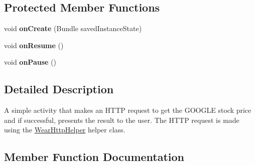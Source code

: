 \subsection*{Protected Member Functions}
\begin{DoxyCompactItemize}
\item 
void {\bfseries on\+Create} (Bundle saved\+Instance\+State)\hypertarget{classcom_1_1example_1_1android_1_1wearable_1_1wcldemo_1_1pages_1_1StockActivity_ad80d4d087998bba535840e7d6905025f}{}\label{classcom_1_1example_1_1android_1_1wearable_1_1wcldemo_1_1pages_1_1StockActivity_ad80d4d087998bba535840e7d6905025f}

\item 
void {\bfseries on\+Resume} ()\hypertarget{classcom_1_1example_1_1android_1_1wearable_1_1wcldemo_1_1pages_1_1StockActivity_a971a19cd31a4dc395d3a95d71b1d5694}{}\label{classcom_1_1example_1_1android_1_1wearable_1_1wcldemo_1_1pages_1_1StockActivity_a971a19cd31a4dc395d3a95d71b1d5694}

\item 
void {\bfseries on\+Pause} ()\hypertarget{classcom_1_1example_1_1android_1_1wearable_1_1wcldemo_1_1pages_1_1StockActivity_a95b544e3a283a8ac3cff062b303557c6}{}\label{classcom_1_1example_1_1android_1_1wearable_1_1wcldemo_1_1pages_1_1StockActivity_a95b544e3a283a8ac3cff062b303557c6}

\end{DoxyCompactItemize}


\subsection{Detailed Description}
A simple activity that makes an H\+T\+TP request to get the G\+O\+O\+G\+LE stock price and if successful, presents the result to the user. The H\+T\+TP request is made using the \hyperlink{}{Wear\+Http\+Helper} helper class. 

\subsection{Member Function Documentation}
